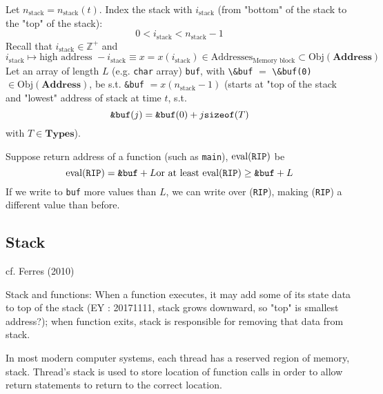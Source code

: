 \documentclass[10pt]{amsart}
\begin{document}
\begin{multicols*}{2}
Let $n_{\text{stack}} = n_{\text{stack}}(t)$.  Index the stack with $i_{\text{stack}}$ (from "bottom" of the stack to the "top" of the stack):
\[
0 < i_{\text{stack}} < n_{\text{stack}} - 1
\]
Recall that $i_{\text{stack}} \in \mathbb{Z}^+$ and 
\[
i_{\text{stack}} \mapsto \text{high address } - i_{\text{stack}} \equiv x = x(i_{\text{stack}}) \in \text{Addresses}_{\text{Memory block}} \subset \text{Obj}(\textbf{Address})
\]
Let an array of length $L$ (e.g. \verb|char| array) \verb|buf|, with \verb|\&buf| $=$ \verb|\&buf(0)| $\in  \text{Obj}{(\textbf{Address})}$, be s.t. \verb|&buf| $=x(n_{\text{stack}}-1)$ (starts at "top of the stack and "lowest" address of stack at time $t$, s.t. 
\[
\verb|&buf|(j) = \verb|&buf|(0) + j \verb|sizeof|(T)
\]
with $T\in \textbf{Types}$).  


Suppose return address of a function (such as \verb|main|), $\text{eval}(\verb|RIP|)$ be 
\[
\text{eval}(\verb|RIP|) = \verb|&buf| + L \text{or at least } \text{eval}(\verb|RIP|) \geq \verb|&buf| + L
\]
If we write to \verb|buf| more values than $L$, we can write over (\verb|RIP|), making (\verb|RIP|) a different value than before.  




\subsection{Stack}
cf. Ferres (2010) \cite{Ferr2010}

Stack and functions: When a function executes, it may add some of its state data to top of the stack (EY : 20171111, stack grows downward, so "top" is smallest address?); when function exits, stack is responsible for removing that data from stack.  

In most modern computer systems, each thread has a reserved region of memory, stack.  Thread's stack is used to store location of function calls in order to allow return statements to return to the correct location.  


\end{multicols*}
\end{document}
